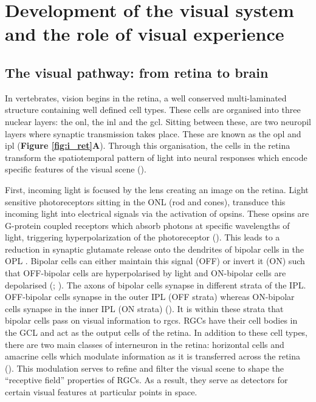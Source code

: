 \section{Development of the visual system and the role of visual experience}

\subsection{The visual pathway: from retina to brain}
In vertebrates, vision begins in the retina, a well conserved multi-laminated structure containing well defined cell types. These cells are organised into three nuclear layers: the \gls{onl}, the \gls{inl} and the \gls{gcl}. Sitting between these, are two neuropil layers where synaptic transmission takes place. These are known as the \gls{opl} and  \gls{ipl} (\textbf{Figure \ref{fig:i_ret}A}). Through this organisation, the cells in the retina transform the spatiotemporal pattern of light into neural responses which encode specific features of the visual scene (\cite{Masland2012TheRetina}).

First, incoming light is focused by the lens creating an image on the retina. Light sensitive photoreceptors sitting in the ONL (rod and cones), transduce this incoming light into electrical signals via the activation of opsins.  These opsins are G-protein coupled receptors which absorb photons at specific wavelengths of light, triggering hyperpolarization of the photoreceptor (\cite{Palczewski2006GRhodopsin}). This leads to a reduction in synaptic glutamate release onto the dendrites of bipolar cells in the OPL . Bipolar cells can either maintain this signal (OFF) or invert it (ON) such that OFF-bipolar cells are hyperpolarised by light and ON-bipolar cells are depolarised (\cite{Werblin1969OrganizationRecording.}; \cite{Masu1995SpecificGene}).  The axons of bipolar cells synapse in different strata of the IPL. OFF-bipolar cells synapse in the outer IPL (OFF strata) whereas ON-bipolar cells synapse in the inner IPL (ON strata) (\cite{Euler2014RetinalVision}). It is within these strata that bipolar cells pass on visual information to \glspl{rgc}. RGCs have their cell bodies in the GCL and act as the output cells of the retina. In addition to these cell types, there are two main classes of interneuron in the retina: horizontal cells and amacrine cells which modulate information as it is transferred across the retina (\cite{Masland2012TheRetina, Hoon2014FunctionalDisease}). This modulation serves to refine and filter the visual scene to shape the “receptive field” properties of RGCs. As a result, they serve as detectors for certain visual features at particular points in space.


